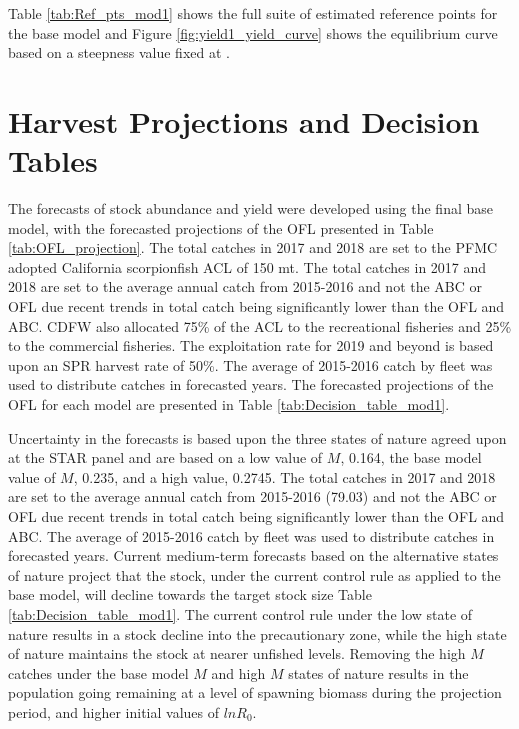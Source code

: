 \documentclass[12pt,]{article}
\begin{document}
Table \ref{tab:Ref_pts_mod1} shows the full suite of estimated reference
points for the base model and Figure \ref{fig:yield1_yield_curve} shows
the equilibrium curve based on a steepness value fixed at .

\section{Harvest Projections and Decision
Tables}\label{harvest-projections-and-decision-tables}

The forecasts of stock abundance and yield were developed using the
final base model, with the forecasted projections of the OFL presented
in Table \ref{tab:OFL_projection}. The total catches in 2017 and 2018
are set to the PFMC adopted California scorpionfish ACL of 150 mt. The
total catches in 2017 and 2018 are set to the average annual catch from
2015-2016 and not the ABC or OFL due recent trends in total catch being
significantly lower than the OFL and ABC. CDFW also allocated 75\% of
the ACL to the recreational fisheries and 25\% to the commercial
fisheries. The exploitation rate for 2019 and beyond is based upon an
SPR harvest rate of 50\%. The average of 2015-2016 catch by fleet was
used to distribute catches in forecasted years. The forecasted
projections of the OFL for each model are presented in Table
\ref{tab:Decision_table_mod1}.

Uncertainty in the forecasts is based upon the three states of nature
agreed upon at the STAR panel and are based on a low value of \(M\),
0.164, the base model value of \(M\), 0.235, and a high value, 0.2745.
The total catches in 2017 and 2018 are set to the average annual catch
from 2015-2016 (79.03) and not the ABC or OFL due recent trends in total
catch being significantly lower than the OFL and ABC. The average of
2015-2016 catch by fleet was used to distribute catches in forecasted
years. Current medium-term forecasts based on the alternative states of
nature project that the stock, under the current control rule as applied
to the base model, will decline towards the target stock size Table
\ref{tab:Decision_table_mod1}. The current control rule under the low
state of nature results in a stock decline into the precautionary zone,
while the high state of nature maintains the stock at nearer unfished
levels. Removing the high \(M\) catches under the base model \(M\) and
high \(M\) states of nature results in the population going remaining at
a level of spawning biomass during the projection period, and higher
initial values of \(lnR_0\).
\end{document}
